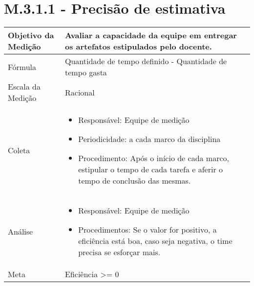 \section{M.3.1.1 - Precisão de estimativa} %

	\begin{tabular}{ |p{4cm}|p{8cm}|  }
	 \hline
	 Objetivo da Medição 		&  	 Avaliar a capacidade da equipe em entregar os artefatos estipulados pelo docente.  \\ %
	 \hline
	 Fórmula		& 	Quantidade de tempo definido - Quantidade de tempo gasta	\\
	 \hline
	 Escala da Medição 		& 	Racional	 \\
	 \hline
	 Coleta		& 	\begin{itemize} \item Responsável: Equipe de medição \item Periodicidade: a cada marco da disciplina \item Procedimento: Após o início de cada marco, estipular o tempo de cada tarefa e aferir o tempo de conclusão das mesmas. \end{itemize}	\\
	 \hline
	 Análise		& 	\begin{itemize} \item Responsável: Equipe de medição \item Procedimentos: Se o valor for positivo, a eficiência está boa, caso seja negativa, o time precisa se esforçar mais. \end{itemize}	 \\
	 \hline
	 Meta		& 	Eficiência >= 0	 \\
	 \hline
	\end{tabular}



